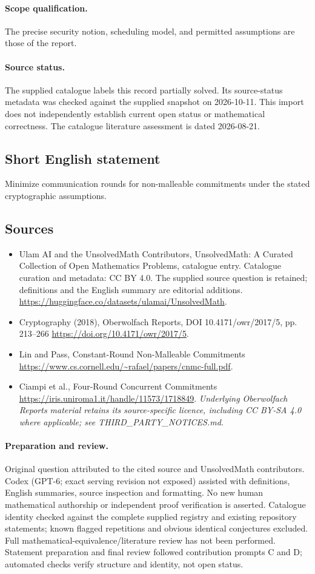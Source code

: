 \documentclass[11pt]{article}
\begin{document}
\paragraph{Scope qualification.}
The precise security notion, scheduling model, and permitted assumptions are those of the report.
\paragraph{Source status.}
The supplied catalogue labels this record partially solved. Its source-status metadata was checked against the supplied snapshot on 2026-10-11. This import does not independently establish current open status or mathematical correctness. The catalogue literature assessment is dated 2026-08-21.
\subsection{Short English statement}
Minimize communication rounds for non-malleable commitments under the stated cryptographic assumptions.
\subsection{Sources}
\begin{itemize}
\item[S1] Ulam AI and the UnsolvedMath Contributors, UnsolvedMath: A Curated Collection of Open Mathematics Problems, catalogue entry. Catalogue curation and metadata: CC BY 4.0. The supplied source question is retained; definitions and the English summary are editorial additions.
\url{https://huggingface.co/datasets/ulamai/UnsolvedMath}.
\item[S2] Cryptography (2018), Oberwolfach Reports, DOI 10.4171/owr/2017/5, pp. 213--266
\url{https://doi.org/10.4171/owr/2017/5}.
\item[S3] Lin and Pass, Constant-Round Non-Malleable Commitments
\url{https://www.cs.cornell.edu/~rafael/papers/cnmc-full.pdf}.
\item[S4] Ciampi et al., Four-Round Concurrent Commitments
\url{https://iris.uniroma1.it/handle/11573/1718849}.
\textit{Underlying Oberwolfach Reports material retains its source-specific licence, including CC BY-SA 4.0 where applicable; see THIRD\_PARTY\_NOTICES.md.}
\end{itemize}
\paragraph{Preparation and review.}
Original question attributed to the cited source and UnsolvedMath contributors. Codex (GPT-6; exact serving revision not exposed) assisted with definitions, English summaries, source inspection and formatting. No new human mathematical authorship or independent proof verification is asserted. Catalogue identity checked against the complete supplied registry and existing repository statements; known flagged repetitions and obvious identical conjectures excluded. Full mathematical-equivalence/literature review has not been performed. Statement preparation and final review followed contribution prompts C and D; automated checks verify structure and identity, not open status.
\label{end:statement}
\end{document}
